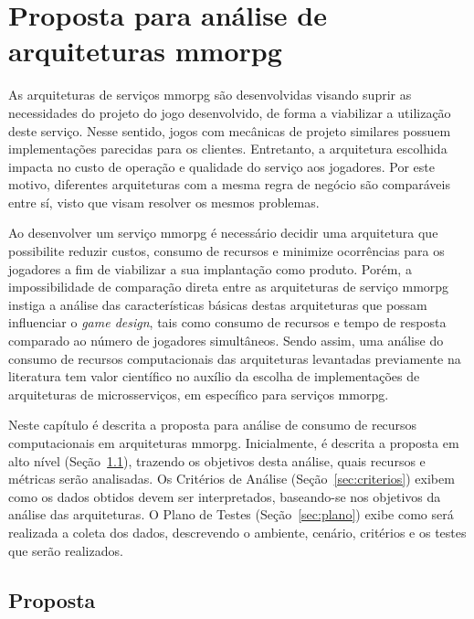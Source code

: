 \chapter{Proposta para análise de arquiteturas \ac{mmorpg}}
\label{cap3}



As arquiteturas de serviços \ac{mmorpg} são desenvolvidas visando suprir as necessidades do projeto do jogo desenvolvido, de forma a viabilizar a utilização deste serviço.
%
Nesse sentido, jogos com mecânicas de projeto similares possuem implementações parecidas para os clientes.
%
Entretanto, a arquitetura escolhida impacta no custo de operação e qualidade do serviço aos jogadores.
%
Por este motivo, diferentes arquiteturas com a mesma regra de negócio são comparáveis entre sí, visto que visam resolver os mesmos problemas.



Ao desenvolver um serviço \ac{mmorpg} é necessário decidir uma arquitetura que possibilite reduzir custos, consumo de recursos e minimize ocorrências para os jogadores a fim de viabilizar a sua implantação como produto.
%
Porém, a impossibilidade de comparação direta entre as arquiteturas de serviço \ac{mmorpg} instiga a análise das características básicas destas arquiteturas que possam influenciar o \textit{game design}, tais como consumo de recursos e tempo de resposta comparado ao número de jogadores simultâneos.
%
Sendo assim, uma análise do consumo de recursos computacionais das arquiteturas levantadas previamente na literatura tem valor científico no auxílio da escolha de implementações de arquiteturas de microsserviços, em específico para serviços \ac{mmorpg}.



Neste capítulo é descrita a proposta para análise de consumo de recursos computacionais em arquiteturas \ac{mmorpg}.
%
Inicialmente, é descrita a proposta em alto nível (Seção~\ref{sec:proposta}), trazendo os objetivos desta análise, quais recursos e métricas serão analisadas.
%
Os Critérios de Análise (Seção~\ref{sec:criterios}) exibem como os dados obtidos devem ser interpretados, baseando-se nos objetivos da análise das arquiteturas.
%
O Plano de Testes (Seção~\ref{sec:plano}) exibe como será realizada a coleta dos dados, descrevendo o ambiente, cenário, critérios e os testes que serão realizados.

\section{Proposta}
\label{sec:proposta}

